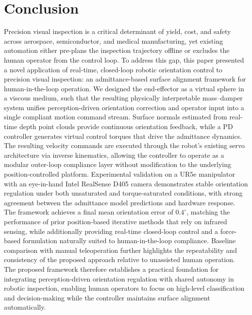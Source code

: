 \documentclass[journal]{IEEEtran}
\begin{document}





\section{Conclusion}
\label{sec:conclusion}

Precision visual inspection is a critical determinant of yield, cost, and safety across aerospace, semiconductor, and medical manufacturing, yet existing automation either pre-plans the inspection trajectory offline or excludes the human operator from the control loop. To address this gap, this paper presented a novel application of real-time, closed-loop robotic orientation control to precision visual inspection: an admittance-based surface alignment framework for human-in-the-loop operation. We designed the end-effector as a virtual sphere in a viscous medium, such that the resulting physically interpretable mass--damper system unifies perception-driven orientation correction and operator input into a single compliant motion command stream. Surface normals estimated from real-time depth point clouds provide continuous orientation feedback, while a PD controller generates virtual control torques that drive the admittance dynamics. The resulting velocity commands are executed through the robot's existing servo architecture via inverse kinematics, allowing the controller to operate as a modular outer-loop compliance layer without modification to the underlying position-controlled platform.
Experimental validation on a UR5e manipulator with an eye-in-hand Intel RealSense D405 camera demonstrates stable orientation regulation under both unsaturated and torque-saturated conditions, with strong agreement between the admittance model predictions and hardware response. The framework achieves a final mean orientation error of $0.4^\circ$, matching the performance of prior position-based iterative methods that rely on infrared sensing, while additionally providing real-time closed-loop control and a force-based formulation naturally suited to human-in-the-loop compliance. Baseline comparison with manual teleoperation further highlights the repeatability and consistency of the proposed approach relative to unassisted human operation.
The proposed framework therefore establishes a practical foundation for integrating perception-driven orientation regulation with shared autonomy in robotic inspection, enabling human operators to focus on high-level classification and decision-making while the controller maintains surface alignment automatically.
\end{document}
